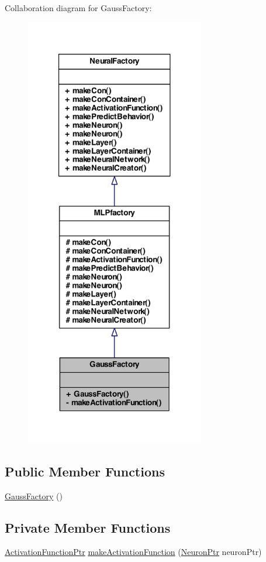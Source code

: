 Collaboration diagram for GaussFactory:\nopagebreak
\begin{figure}[H]
\begin{center}
\leavevmode
\includegraphics[width=222pt]{class_gauss_factory__coll__graph}
\end{center}
\end{figure}
\subsection*{Public Member Functions}
\begin{DoxyCompactItemize}
\item 
\hyperlink{class_gauss_factory_ab6a0d29d7dc5fe78ebbaf6f2e37ec686}{GaussFactory} ()
\end{DoxyCompactItemize}
\subsection*{Private Member Functions}
\begin{DoxyCompactItemize}
\item 
\hyperlink{_a_m_o_r_e_8h_a77602a0277a02e5769c3df0adc669b17}{ActivationFunctionPtr} \hyperlink{class_gauss_factory_a0a937a783740366b0c07264f1d707ea7}{makeActivationFunction} (\hyperlink{_a_m_o_r_e_8h_ac1ea936c2c7728eb382278131652fef4}{NeuronPtr} neuronPtr)
\end{DoxyCompactItemize}


